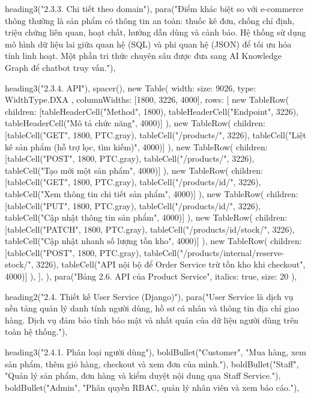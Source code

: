   heading3("2.3.3. Chi tiết theo domain"),
  para("Điểm khác biệt so với e-commerce thông thường là sản phẩm có thông tin an toàn: thuốc kê đơn, chống chỉ định, triệu chứng liên quan, hoạt chất, hướng dẫn dùng và cảnh báo. Hệ thống sử dụng mô hình dữ liệu lai giữa quan hệ (SQL) và phi quan hệ (JSON) để tối ưu hóa tính linh hoạt. Một phần tri thức chuyên sâu được đưa sang AI Knowledge Graph để chatbot truy vấn."),

  heading3("2.3.4. API"),
  spacer(),
  new Table({
    width: { size: 9026, type: WidthType.DXA },
    columnWidths: [1800, 3226, 4000],
    rows: [
      new TableRow({ children: [tableHeaderCell("Method", 1800), tableHeaderCell("Endpoint", 3226), tableHeaderCell("Mô tả chức năng", 4000)] }),
      new TableRow({ children: [tableCell("GET", 1800, PTC.gray), tableCell("/products/", 3226), tableCell("Liệt kê sản phẩm (hỗ trợ lọc, tìm kiếm)", 4000)] }),
      new TableRow({ children: [tableCell("POST", 1800, PTC.gray), tableCell("/products/", 3226), tableCell("Tạo mới một sản phẩm", 4000)] }),
      new TableRow({ children: [tableCell("GET", 1800, PTC.gray), tableCell("/products/{id}/", 3226), tableCell("Xem thông tin chi tiết sản phẩm", 4000)] }),
      new TableRow({ children: [tableCell("PUT", 1800, PTC.gray), tableCell("/products/{id}/", 3226), tableCell("Cập nhật thông tin sản phẩm", 4000)] }),
      new TableRow({ children: [tableCell("PATCH", 1800, PTC.gray), tableCell("/products/{id}/stock/", 3226), tableCell("Cập nhật nhanh số lượng tồn kho", 4000)] }),
      new TableRow({ children: [tableCell("POST", 1800, PTC.gray), tableCell("/products/internal/reserve-stock/", 3226), tableCell("API nội bộ để Order Service trừ tồn kho khi checkout", 4000)] }),
    ],
  }),
  para("Bảng 2.6. API của Product Service", { italics: true, size: 20 }),

  heading2("2.4. Thiết kế User Service (Django)"),
  para("User Service là dịch vụ nền tảng quản lý danh tính người dùng, hồ sơ cá nhân và thông tin địa chỉ giao hàng. Dịch vụ đảm bảo tính bảo mật và nhất quán của dữ liệu người dùng trên toàn hệ thống."),

  heading3("2.4.1. Phân loại người dùng"),
  boldBullet("Customer", "Mua hàng, xem sản phẩm, thêm giỏ hàng, checkout và xem đơn của mình."),
  boldBullet("Staff", "Quản lý sản phẩm, đơn hàng và kiểm duyệt nội dung qua Staff Service."),
  boldBullet("Admin", "Phân quyền RBAC, quản lý nhân viên và xem báo cáo."),

